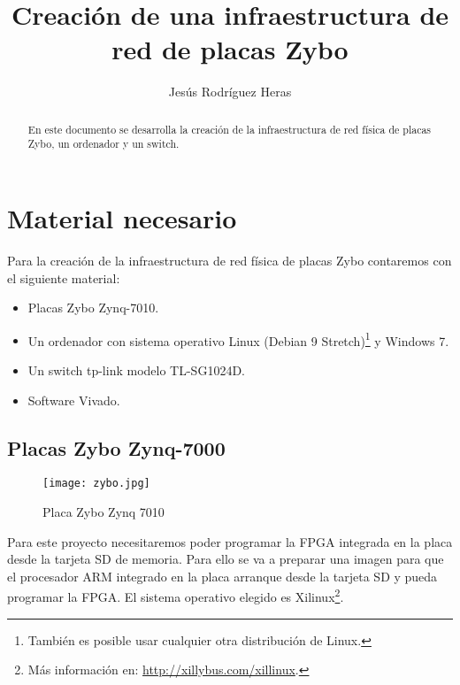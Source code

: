 \documentclass[12pt,letterpaper]{article}
\title{Creación de una infraestructura de red de placas Zybo}
\author{Jesús Rodríguez Heras}
\begin{document}
	
	\maketitle
	\begin{abstract} %
		\begin{center}
			En este documento se desarrolla la creación de la infraestructura de red física de placas Zybo, un ordenador y un switch.
		\end{center}
	\end{abstract}
	\thispagestyle{empty}
	\newpage
	
	\tableofcontents
	\newpage
	
	
	
	
	\lstset{language=bash, numbers=left, numberstyle=\tiny, numbersep=10pt, firstnumber=1, stepnumber=1, basicstyle=\small\ttfamily, tabsize=1, extendedchars=true, inputencoding=latin1}


\section{Material necesario}
Para la creación de la infraestructura de red física de placas Zybo contaremos con el siguiente material:
\begin{itemize}
	\item Placas Zybo Zynq-7010.
	\item Un ordenador con sistema operativo Linux (Debian 9 Stretch)\footnote{También es posible usar cualquier otra distribución de Linux.} y Windows 7.
	\item Un switch tp-link modelo TL-SG1024D.
	\item Software Vivado.
\end{itemize}


\subsection{Placas Zybo Zynq-7000}
\begin{figure}[h]
	\centering
	\texttt{[image: zybo.jpg]}
	\caption{Placa Zybo Zynq 7010}
	\label{Placa Zybo}
\end{figure}
Para este proyecto necesitaremos poder programar la FPGA integrada en la placa desde la tarjeta SD de memoria. Para ello se va a preparar una imagen para que el procesador ARM integrado en la placa arranque desde la tarjeta SD y pueda programar la FPGA. El sistema operativo elegido es Xilinux\footnote{Más información en: \url{http://xillybus.com/xillinux}.}.
\end{document}
